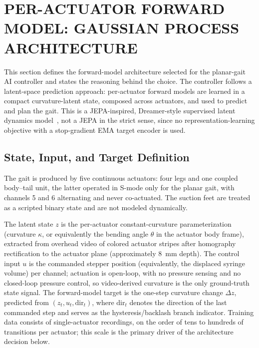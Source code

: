 

\section{PER-ACTUATOR FORWARD MODEL: GAUSSIAN PROCESS ARCHITECTURE}
\label{sec:gp_forward_model}

This section defines the forward-model architecture selected for the planar-gait AI controller and states the reasoning behind the choice. The controller follows a latent-space prediction approach: per-actuator forward models are learned in a compact curvature-latent state, composed across actuators, and used to predict and plan the gait. This is a JEPA-inspired, Dreamer-style supervised latent dynamics model~\cite{Assran2025VJEPA2}, not a JEPA in the strict sense, since no representation-learning objective with a stop-gradient EMA target encoder is used.

\subsection{State, Input, and Target Definition}

The gait is produced by five continuous actuators: four legs and one coupled body--tail unit, the latter operated in S-mode only for the planar gait, with channels 5 and 6 alternating and never co-actuated. The suction feet are treated as a scripted binary state and are not modeled dynamically.

The latent state $z$ is the per-actuator constant-curvature parameterization (curvature $\kappa$, or equivalently the bending angle $\theta$ in the actuator body frame), extracted from overhead video of colored actuator stripes after homography rectification to the actuator plane (approximately 8~mm depth). The control input $u$ is the commanded stepper position (equivalently, the displaced syringe volume) per channel; actuation is open-loop, with no pressure sensing and no closed-loop pressure control, so video-derived curvature is the only ground-truth state signal. The forward-model target is the one-step curvature change $\Delta z$, predicted from $(z_t, u_t, \mathrm{dir}_t)$, where $\mathrm{dir}_t$ denotes the direction of the last commanded step and serves as the hysteresis/backlash branch indicator. Training data consists of single-actuator recordings, on the order of tens to hundreds of transitions per actuator; this scale is the primary driver of the architecture decision below.

